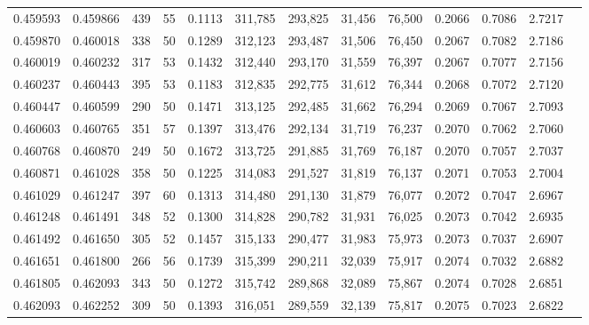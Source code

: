\begin{tabular}{rrrrrrrrrrrrr}
0.459593 & 0.459866 &   439 &  55 &                                     0.1113 & 311,785 & 293,825 &  31,456 &  76,500 & 0.2066 & 0.7086 & 2.7217 \\
0.459870 & 0.460018 &   338 &  50 &                                     0.1289 & 312,123 & 293,487 &  31,506 &  76,450 & 0.2067 & 0.7082 & 2.7186 \\
0.460019 & 0.460232 &   317 &  53 &                                     0.1432 & 312,440 & 293,170 &  31,559 &  76,397 & 0.2067 & 0.7077 & 2.7156 \\
0.460237 & 0.460443 &   395 &  53 &                                     0.1183 & 312,835 & 292,775 &  31,612 &  76,344 & 0.2068 & 0.7072 & 2.7120 \\
0.460447 & 0.460599 &   290 &  50 &                                     0.1471 & 313,125 & 292,485 &  31,662 &  76,294 & 0.2069 & 0.7067 & 2.7093 \\
0.460603 & 0.460765 &   351 &  57 &                                     0.1397 & 313,476 & 292,134 &  31,719 &  76,237 & 0.2070 & 0.7062 & 2.7060 \\
0.460768 & 0.460870 &   249 &  50 &                                     0.1672 & 313,725 & 291,885 &  31,769 &  76,187 & 0.2070 & 0.7057 & 2.7037 \\
0.460871 & 0.461028 &   358 &  50 &                                     0.1225 & 314,083 & 291,527 &  31,819 &  76,137 & 0.2071 & 0.7053 & 2.7004 \\
0.461029 & 0.461247 &   397 &  60 &                                     0.1313 & 314,480 & 291,130 &  31,879 &  76,077 & 0.2072 & 0.7047 & 2.6967 \\
0.461248 & 0.461491 &   348 &  52 &                                     0.1300 & 314,828 & 290,782 &  31,931 &  76,025 & 0.2073 & 0.7042 & 2.6935 \\
0.461492 & 0.461650 &   305 &  52 &                                     0.1457 & 315,133 & 290,477 &  31,983 &  75,973 & 0.2073 & 0.7037 & 2.6907 \\
0.461651 & 0.461800 &   266 &  56 &                                     0.1739 & 315,399 & 290,211 &  32,039 &  75,917 & 0.2074 & 0.7032 & 2.6882 \\
0.461805 & 0.462093 &   343 &  50 &                                     0.1272 & 315,742 & 289,868 &  32,089 &  75,867 & 0.2074 & 0.7028 & 2.6851 \\
0.462093 & 0.462252 &   309 &  50 &                                     0.1393 & 316,051 & 289,559 &  32,139 &  75,817 & 0.2075 & 0.7023 & 2.6822 \\

\end{tabular}
